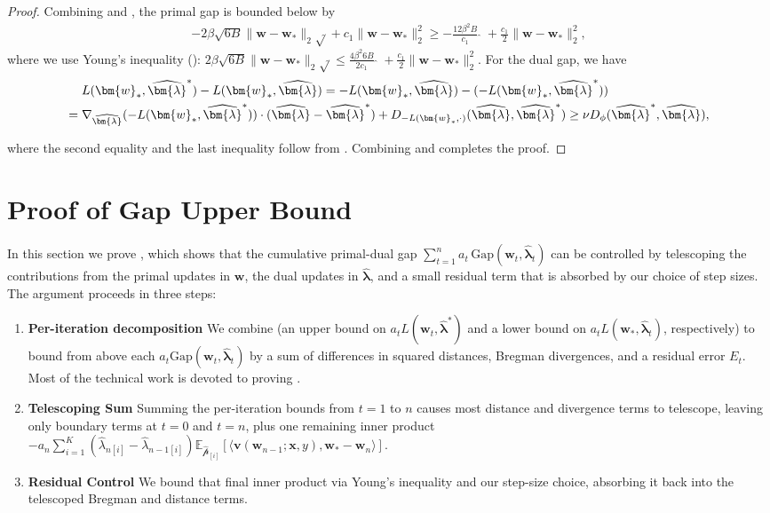 \documentclass[11pt]{article}
\numberwithin{thm}{section}
\theoremstyle{plain}
\theoremstyle{definition}
\theoremstyle{remark} \newtheorem{remark}[thm]{Remark}
\def\vlambda{{\bm{\lambda}}}
\def\vv{{\bm{v}}}
\def\vw{{\bm{w}}}
\def\vx{{\bm{x}}}
\def\ep{\widehat{\mathcal{p}}}
\newcommand{\E}{\mathbb{E}}
\newcommand{\innp}[1]{\langle #1 \rangle}
\newcommand{\Gap}{\mathrm{Gap}}
\newcommand{\epi}{\ep_{[i]}}
\newcommand{\elambda}{\widehat{\lambda}}
\newcommand{\evlambda}{\widehat{\vlambda}}
\DeclareMathOperator{\mOPT}{OPT_m}
\newcommand{\mOPThat}{\widehat{\mOPT}}
\begin{document}
\begin{proof}
	Combining  and  , the primal gap is bounded below by
    \begin{align}\label{eq:lb-gap-primal}
	- 2 \beta \sqrt{6 B} \|\vw - \vw_*\|_{2} \sqrt{\mOPThat }  + c_1 \|\vw - \vw_*\|_{2}^{2}
      {\ge -\frac{12 \beta^{2} B}{c_{1}} \mOPThat + \frac{c_1}{2} \|\vw - \vw_*\|_{2}^{2}},
    \end{align}
    where we use Young's inequality (): $2 \beta \sqrt{6 B} \|\vw - \vw_*\|_{2} \sqrt{\mOPThat } \leq \frac{4\beta^2 {6B}}{2c_1}\mOPThat  + \frac{c_1}{2} \|\vw - \vw_*\|_{2}^{2}$.
    For the dual gap, we have
    \begin{align}\label{eq:lb-gap-dual}
        & \; L(\vw_*, \evlambda^{*}) - L(\vw_*, \evlambda)
        = -L(\vw_*, \evlambda) - (-L(\vw_*, \evlambda^{*})) \notag \\
        = &\;  \nabla_{\evlambda}(-L(\vw_*, \evlambda^{*})) \cdot (\evlambda - \evlambda^{*})+D_{-L(\vw_*,\cdot)}(\evlambda, \evlambda^{*}) \geq \nu D_{\phi}(\evlambda^{*}, \evlambda),
    \end{align}

    where the second equality and the last inequality follow from . Combining  and  completes the proof.         
\end{proof}


\section{Proof of Gap Upper Bound}\label{app:gap-upper-bound}
In this section we prove , which shows that the cumulative primal-dual gap 
\(\sum_{t=1}^{n}a_{t}\,\Gap(\vw_{t},\evlambda_{t})\)
can be controlled by telescoping the contributions from the primal updates in \(\vw\), the dual updates in \(\evlambda\), and a small residual term that is absorbed by our choice of step sizes.  The argument proceeds in three steps:
\begin{enumerate}
	\item \textbf{Per-iteration decomposition} We combine  (an upper bound on \(a_tL(\vw_{t}, \evlambda^{*})\) and a lower bound on \(a_tL(\vw_*, \evlambda_{t})\), respectively) to bound from above each \(a_{t}\Gap(\vw_{t},\evlambda_{t})\) by a sum of differences in squared distances, Bregman divergences, and a residual error \(E_{t}\). Most of the technical work is devoted to proving . 
	\item \textbf{Telescoping Sum} Summing the per-iteration bounds from \(t=1\) to \(n\) causes most distance and divergence terms to telescope, leaving only boundary terms at \(t=0\) and \(t=n\), plus one remaining inner product \(-a_n\sum_{i=1}^K(\elambda_{n[i]}-\elambda_{n-1[i]})\E_{\epi}[\innp{\vv(\vw_{n-1};\vx,y), \vw_*-\vw_n}]\).
\item \textbf{Residual Control} We bound that final inner product via Young's inequality and our step-size choice, absorbing it back into the telescoped Bregman and distance terms.
\end{enumerate}
\end{document}
